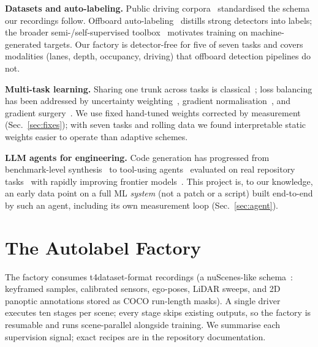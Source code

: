\documentclass[10pt,twocolumn]{article}
\begin{document}
\textbf{Datasets and auto-labeling.} Public driving corpora~\citep{geiger2012kitti,caesar2020nuscenes,sun2020waymo,wilson2021argoverse2,yu2020bdd100k,mao2021once}
standardised the schema our recordings follow. Offboard
auto-labeling~\citep{qi2021offboard,yang2021auto4d} distills strong
detectors into labels; the broader semi-/self-supervised
toolbox~\citep{lee2013pseudolabel,tarvainen2017meanteacher,sohn2020fixmatch,xie2020noisystudent,hinton2015kd,he2022mae,oquab2023dinov2}
motivates training on machine-generated targets. Our factory is
detector-free for five of seven tasks and covers modalities (lanes, depth,
occupancy, driving) that offboard detection pipelines do not.

\textbf{Multi-task learning.} Sharing one trunk across tasks is
classical~\citep{caruana1997mtl,kokkinos2017ubernet,zamir2018taskonomy};
loss balancing has been addressed by uncertainty
weighting~\citep{kendall2018uncertainty}, gradient
normalisation~\citep{chen2018gradnorm}, and gradient
surgery~\citep{yu2020pcgrad}. We use fixed hand-tuned weights corrected by
measurement (Sec.~\ref{sec:fixes}); with seven tasks and rolling data we
found interpretable static weights easier to operate than adaptive schemes.

\textbf{LLM agents for engineering.} Code generation has progressed from
benchmark-level synthesis~\citep{chen2021codex,li2022alphacode} to
tool-using agents~\citep{yao2023react} evaluated on real repository
tasks~\citep{jimenez2024swebench} with rapidly improving frontier
models~\citep{openai2023gpt4}. This project is, to our knowledge, an early
data point on a full ML \emph{system} (not a patch or a script) built
end-to-end by such an agent, including its own measurement loop
(Sec.~\ref{sec:agent}).

\section{The Autolabel Factory}
\label{sec:factory}
The factory consumes t4dataset-format recordings (a nuScenes-like
schema~\citep{caesar2020nuscenes}: keyframed samples, calibrated sensors,
ego-poses, LiDAR sweeps, and 2D panoptic annotations stored as COCO
run-length masks). A single driver executes ten stages per scene; every stage
skips existing outputs, so the factory is resumable and runs scene-parallel
alongside training. We summarise each supervision signal; exact recipes are in
the repository documentation.
\end{document}
